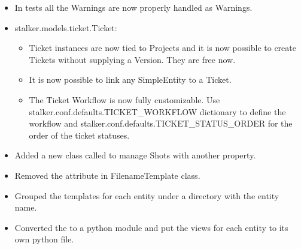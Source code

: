\documentclass[a4paper,10pt,english]{sphinxmanual}
\begin{document}
\begin{itemize}
\item {} 
In tests all the Warnings are now properly handled as Warnings.

\item {} 
stalker.models.ticket.Ticket:
\begin{itemize}
\item {} 
Ticket instances are now tied to Projects and it is now possible to create
Tickets without supplying a Version. They are free now.

\item {} 
It is now possible to link any SimpleEntity to a Ticket.

\item {} 
The Ticket Workflow is now fully customizable. Use
stalker.conf.defaults.TICKET\_WORKFLOW dictionary to define the workflow and
stalker.conf.defaults.TICKET\_STATUS\_ORDER for the order of the ticket
statuses.

\end{itemize}

\item {} 
Added a new class called  to manage Shots with another property.

\item {} 
Removed the  attribute in FilenameTemplate class.

\item {} 
Grouped the templates for each entity under a directory with the entity name.

\item {} 
Converted the  to a python module and put the views for each
entity to its own python file.

\end{itemize}
\end{document}
